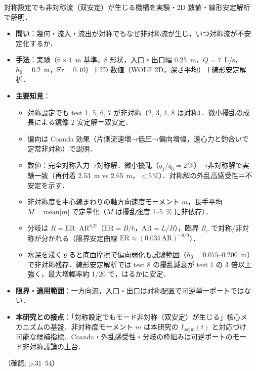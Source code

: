 \documentclass[11pt]{jsarticle}
\newcommand{\litref}[1]{{\large\bfseries\color{citecolor}#1}}
\begin{document}
\noindent\litref{Dewals et al. (2008)}\quad 対称設定でも非対称流（双安定）が生じる機構を実験・2D 数値・線形安定解析で解明．
\begin{itemize}
  \item \textbf{問い}：幾何・流入・流出が対称でもなぜ非対称流が生じ，いつ対称流が不安定化するか．
  \item \textbf{手法}：実験（$6 \times 4$~m 基準，8 形状，入口・出口幅 0.25~m，$Q = 7$~L/s，$h_0 = 0.2$~m，$\mathrm{Fr} = 0.10$）＋2D 数値（WOLF 2D，深さ平均）＋線形安定解析．
  \item \textbf{主要知見}：
  \begin{itemize}
    \item 対称設定でも test 1, 5, 6, 7 が非対称（2, 3, 4, 8 は対称）．微小擾乱の成長による鏡像 2 安定解＝双安定．
    \item 偏向は Coanda 効果（片側流速増→低圧→偏向増幅，遠心力と釣合いで定常非対称）で説明．
    \item 数値：完全対称入力→対称解．微小擾乱（$q_1/q_0 = 2\,\%$）→非対称解で実験一致（再付着 2.53~m vs 2.65~m，$< 5\,\%$）．対称解の外乱高感受性＝不安定を示す．
    \item 非対称度を中心線まわりの軸方向速度モーメント $m$，長手平均 $M = \mathrm{mean}|m|$ で定量化（$M$ は擾乱強度 1--5~\% に非依存）．
    \item 分岐は $R = \mathrm{ER} \cdot \mathrm{AR}^{8/9}$（$\mathrm{ER} = B/b$，$\mathrm{AR} = L/B$），臨界 $R_c$ で対称/非対称が分かれる（限界安定曲線 $\mathrm{ER} \approx (0.035\,\mathrm{AR})^{-8/9}$）．
    \item 水深を浅くすると底面摩擦で偏向弱化も試験範囲（$h_0 = 0.075$--$0.200$~m）で非対称残存．線形安定解析では test 8 の擾乱減衰が test 1 の 3 倍以上強く，最大増幅率約 1/20 で，はるかに安定．
  \end{itemize}
  \item \textbf{限界・適用範囲}：一方向流，入口・出口は対称配置で可逆単一ポートではない．
  \item \textbf{本研究との接点}：「対称設定でもモード非対称（双安定）が生じる」核心メカニズムの基盤．非対称度モーメント $m$ は本研究の $I_\mathrm{asym}(t)$ と対応づけ可能な候補指標．Coanda・外乱感受性・分岐の枠組みは可逆ポートのモード非対称議論の土台．
\end{itemize}
\noindent（確認: p.31--54）
\end{document}
